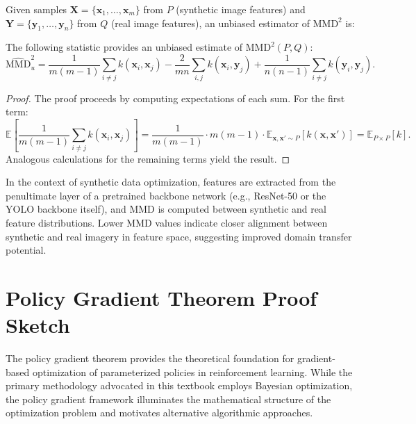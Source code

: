 Given samples $\mathbf{X} = \{\mathbf{x}_1, \ldots, \mathbf{x}_m\}$ from $P$ (synthetic image features) and $\mathbf{Y} = \{\mathbf{y}_1, \ldots, \mathbf{y}_n\}$ from $Q$ (real image features), an unbiased estimator of $\text{MMD}^2$ is:

\begin{theorem}
\label{thm:mmd_estimator}
The following statistic provides an unbiased estimate of $\text{MMD}^2(P, Q)$:
\begin{equation}
\widehat{\text{MMD}}^2_u = \frac{1}{m(m-1)} \sum_{i \neq j} k(\mathbf{x}_i, \mathbf{x}_j) - \frac{2}{mn} \sum_{i,j} k(\mathbf{x}_i, \mathbf{y}_j) + \frac{1}{n(n-1)} \sum_{i \neq j} k(\mathbf{y}_i, \mathbf{y}_j).
\end{equation}
\end{theorem}

\begin{proof}
The proof proceeds by computing expectations of each sum. For the first term:
\begin{equation}
\mathbb{E}\left[\frac{1}{m(m-1)} \sum_{i \neq j} k(\mathbf{x}_i, \mathbf{x}_j)\right] = \frac{1}{m(m-1)} \cdot m(m-1) \cdot \mathbb{E}_{\mathbf{x}, \mathbf{x}' \sim P}\left[k(\mathbf{x}, \mathbf{x}')\right] = \mathbb{E}_{P \times P}[k].
\end{equation}
Analogous calculations for the remaining terms yield the result.
\end{proof}

In the context of synthetic data optimization, features are extracted from the penultimate layer of a pretrained backbone network (e.g., ResNet-50 or the YOLO backbone itself), and MMD is computed between synthetic and real feature distributions. Lower MMD values indicate closer alignment between synthetic and real imagery in feature space, suggesting improved domain transfer potential.

\section{Policy Gradient Theorem Proof Sketch}
\label{sec:policy_gradient}

The policy gradient theorem provides the theoretical foundation for gradient-based optimization of parameterized policies in reinforcement learning. While the primary methodology advocated in this textbook employs Bayesian optimization, the policy gradient framework illuminates the mathematical structure of the optimization problem and motivates alternative algorithmic approaches.

